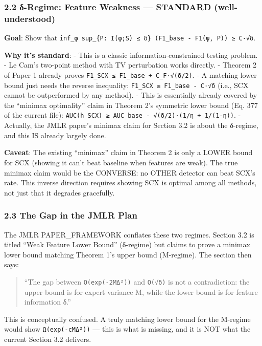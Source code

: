 \documentclass[
  12pt,
]{article}
\begin{document}
\subsubsection{2.2 δ-Regime: Feature Weakness --- STANDARD
(well-understood)}\label{ux3b4-regime-feature-weakness-standard-well-understood}

\textbf{Goal}: Show that
\texttt{inf\_φ\ sup\_\{P:\ I(φ;S)\ ≤\ δ\}\ (F1\_base\ -\ F1(ψ,\ P))\ ≥\ C·√δ}.

\textbf{Why it's standard}: - This is a classic information-constrained
testing problem. - Le Cam's two-point method with TV perturbation works
directly. - Theorem 2 of Paper 1 already proves
\texttt{F1\_SCX\ ≤\ F1\_base\ +\ C\_F·√(δ/2)}. - A matching lower bound
just needs the reverse inequality:
\texttt{F1\_SCX\ ≥\ F1\_base\ -\ C·√δ} (i.e., SCX cannot be outperformed
by any method). - This is essentially already covered by the ``minimax
optimality'' claim in Theorem 2's symmetric lower bound (Eq. 377 of the
current file):
\texttt{AUC(h\_SCX)\ ≥\ AUC\_base\ -\ √(δ/2)·(1/η\ +\ 1/(1-η))}. -
Actually, the JMLR paper's minimax claim for Section 3.2 is about the
δ-regime, and this IS already largely done.

\textbf{Caveat}: The existing ``minimax'' claim in Theorem 2 is only a
LOWER bound for SCX (showing it can't beat baseline when features are
weak). The true minimax claim would be the CONVERSE: no OTHER detector
can beat SCX's rate. This inverse direction requires showing SCX is
optimal among all methods, not just that it degrades gracefully.

\subsubsection{2.3 The Gap in the JMLR
Plan}\label{the-gap-in-the-jmlr-plan}

The JMLR PAPER\_FRAMEWORK conflates these two regimes. Section 3.2 is
titled ``Weak Feature Lower Bound'' (δ-regime) but claims to prove a
minimax lower bound matching Theorem 1's upper bound (M-regime). The
section then says:

\begin{quote}
``The gap between \texttt{O(exp(-2MΔ²))} and \texttt{O(√δ)} is not a
contradiction: the upper bound is for expert variance M, while the lower
bound is for feature information δ.''
\end{quote}

This is conceptually confused. A truly matching lower bound for the
M-regime would show \texttt{Ω(exp(-cMΔ²))} --- this is what is missing,
and it is NOT what the current Section 3.2 delivers.
\end{document}
